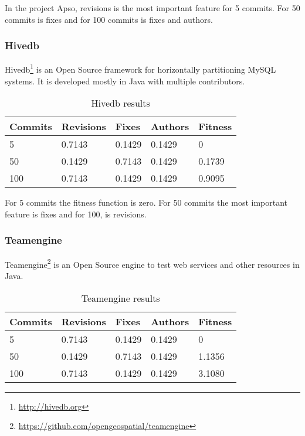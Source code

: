 In the project Apso, revisions is the most important feature for 5 commits. For 50 commits is fixes and for 100 commits is fixes and authors.

\subsubsection{Hivedb}
Hivedb\footnote{\url{http://hivedb.org}} is an Open Source framework for horizontally partitioning MySQL systems. It is developed mostly in Java with multiple contributors.

\begin{table}[H]
    \centering
    \caption{Hivedb results}
    \label{table:learning_hivedb}
    \begin{tabular}{|l|l|l|l|l|}
        \hline
        Commits & Revisions & Fixes & Authors & Fitness \\ \hline
        5         & 0.7143     & 0.1429 & 0.1429   & 0  \\ \hline     
        50        & 0.1429 & 0.7143 & 0.1429   & 0.1739 \\ \hline    
        100       & 0.7143     & 0.1429  & 0.1429   & 0.9095 \\ \hline
    \end{tabular}
\end{table}

For 5 commits the fitness function is zero. For 50 commits the most important feature is fixes and for 100, is revisions.

\subsubsection{Teamengine}
Teamengine\footnote{\url{https://github.com/opengeospatial/teamengine}} is an Open Source engine to test web services and other resources in Java.

\begin{table}[H]
    \centering
    \caption{Teamengine results}
    \label{table:learning_teamengine}
    \begin{tabular}{|l|l|l|l|l|}
        \hline
        Commits & Revisions & Fixes & Authors & Fitness \\ \hline
        5         & 0.7143     & 0.1429 & 0.1429   & 0  \\ \hline
        50        & 0.1429 & 0.7143 & 0.1429   & 1.1356 \\ \hline
        100       & 0.7143     & 0.1429  & 0.1429   & 3.1080 \\ \hline
    \end{tabular}
\end{table}

